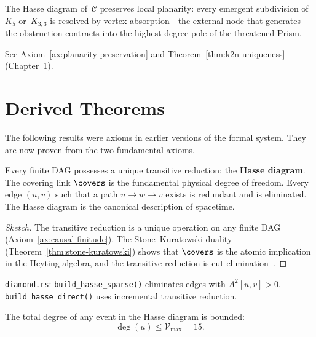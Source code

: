 \begin{axiom}
\label{ax:planarity-preservation-app}
The Hasse diagram of~$\mathcal{C}$ preserves local
planarity: every emergent subdivision of~$K_5$ or~$K_{3,3}$ is
resolved by vertex absorption---the external node that
generates the obstruction contracts into the highest-degree pole of
the threatened Prism.

\medskip\noindent
See Axiom~\ref{ax:planarity-preservation} and
Theorem~\ref{thm:k2n-uniqueness} (Chapter~1).
\end{axiom}

\section{Derived Theorems}
\label{sec:derived-theorems}

\noindent
The following results were axioms in earlier versions of the
formal system. They are now proven from the two fundamental
axioms.

\begin{theorem}
\label{thm:covering-differential}
Every finite DAG possesses a unique transitive reduction: the
\textbf{Hasse diagram}. The covering link $\covers$ is
the fundamental physical degree of freedom. Every edge $(u,v)$ such
that a path $u \to w \to v$ exists is redundant and is eliminated.
The Hasse diagram is the canonical description of
spacetime.
\end{theorem}

\begin{proof}[Sketch]
The transitive reduction is a unique operation on any
finite DAG (Axiom~\ref{ax:causal-finitude}). The
Stone--Kuratowski duality (Theorem~\ref{thm:stone-kuratowski}) shows that
$\covers$ is the atomic implication in the Heyting
algebra, and the transitive reduction is cut
elimination~\cite{gentzen1935}.
\end{proof}

\medskip\noindent
\texttt{diamond.rs}: \texttt{build\_hasse\_sparse()} eliminates
edges with $A^2[u,v] > 0$. \texttt{build\_hasse\_direct()} uses
incremental transitive reduction.

\begin{theorem}
\label{thm:valence-saturation}
The total degree of any event in the Hasse diagram is
bounded:
\begin{equation}
  \deg(u) \leq \mathcal{V}_{\max} = 15.
  \label{eq:ax-valence}
\end{equation}
\end{theorem}

